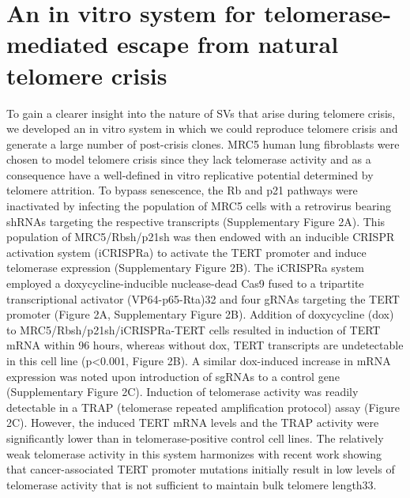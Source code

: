 \documentclass[phd,tocprelim]{cornell}
\begin{document}
\section{An in vitro system for telomerase-mediated escape from natural telomere crisis }
To gain a clearer insight into the nature of SVs that arise during telomere crisis, we developed an in vitro system in which we could reproduce telomere crisis and generate a large number of post-crisis clones. MRC5 human lung fibroblasts were chosen to model telomere crisis since they lack telomerase activity and as a consequence have a well-defined in vitro replicative potential determined by telomere attrition. To bypass senescence, the Rb and p21 pathways were inactivated by infecting the population of MRC5 cells with a retrovirus bearing shRNAs targeting the respective transcripts (Supplementary Figure 2A). This population of MRC5/Rbsh/p21sh was then endowed with an inducible CRISPR activation system (iCRISPRa) to activate the TERT promoter and induce telomerase expression (Supplementary Figure 2B). The iCRISPRa system employed a doxycycline-inducible nuclease-dead Cas9 fused to a tripartite transcriptional activator (VP64-p65-Rta)32 and four gRNAs targeting the TERT promoter (Figure 2A, Supplementary Figure 2B). Addition of doxycycline (dox) to MRC5/Rbsh/p21sh/iCRISPRa-TERT cells resulted in induction of TERT mRNA within 96 hours, whereas without dox, TERT transcripts are undetectable in this cell line (p<0.001, Figure 2B). A similar dox-induced increase in mRNA expression was noted upon introduction of sgRNAs to a control gene (Supplementary Figure 2C). Induction of telomerase activity was readily detectable in a TRAP (telomerase repeated amplification protocol) assay (Figure 2C). However, the induced TERT mRNA levels and the TRAP activity were significantly lower than in telomerase-positive control cell lines. The relatively weak telomerase activity in this system harmonizes with recent work showing that cancer-associated TERT promoter mutations initially result in low levels of telomerase activity that is not sufficient to maintain bulk telomere length33. 
\end{document}
